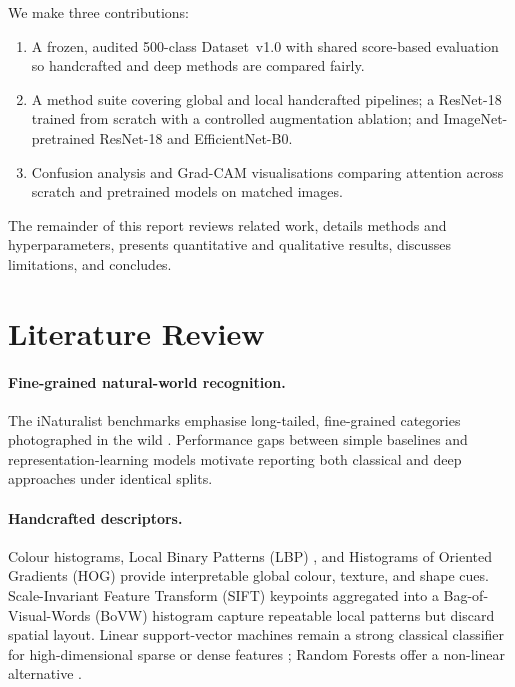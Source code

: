 \documentclass[10pt,twocolumn,letterpaper]{article}
\begin{document}
We make three contributions:
\begin{enumerate}
  \item A frozen, audited 500-class Dataset~v1.0 with shared score-based
  evaluation so handcrafted and deep methods are compared fairly.
  \item A method suite covering global and local handcrafted pipelines; a
  ResNet-18 trained from scratch with a controlled augmentation ablation; and
  ImageNet-pretrained ResNet-18 and EfficientNet-B0.
  \item Confusion analysis and Grad-CAM visualisations comparing attention
  across scratch and pretrained models on matched images.
\end{enumerate}

The remainder of this report reviews related work, details methods and
hyperparameters, presents quantitative and qualitative results, discusses
limitations, and concludes.

\section{Literature Review}

\paragraph{Fine-grained natural-world recognition.}
The iNaturalist benchmarks emphasise long-tailed, fine-grained categories
photographed in the wild \cite{vanhorn2018inaturalist,vanhorn2021benchmarking}.
Performance gaps between simple baselines and representation-learning models
motivate reporting both classical and deep approaches under identical splits.

\paragraph{Handcrafted descriptors.}
Colour histograms, Local Binary Patterns (LBP) \cite{ojala2002multiresolution},
and Histograms of Oriented Gradients (HOG) \cite{dalal2005histograms} provide
interpretable global colour, texture, and shape cues. Scale-Invariant Feature
Transform (SIFT) keypoints \cite{lowe2004distinctive} aggregated into a
Bag-of-Visual-Words (BoVW) histogram \cite{csurka2004visual} capture
repeatable local patterns but discard spatial layout. Linear support-vector
machines remain a strong classical classifier for high-dimensional sparse or
dense features \cite{cortes1995support,pedregosa2011scikit}; Random Forests
offer a non-linear alternative \cite{breiman2001random}.
\end{document}
